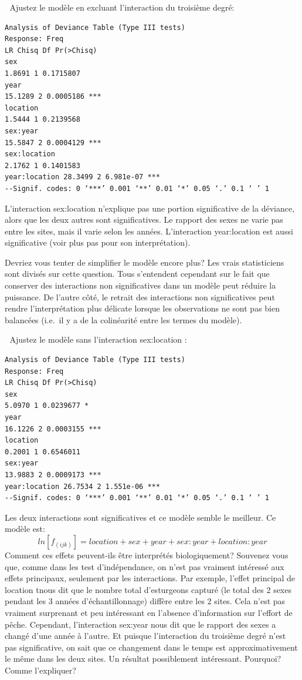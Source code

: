 \documentclass[12pt,]{book}
\begin{document}
 Ajustez le modèle en excluant l'interaction du troisième degré:

\begin{verbatim}
Analysis of Deviance Table (Type III tests)
Response: Freq
LR Chisq Df Pr(>Chisq)
sex
1.8691 1 0.1715807
year
15.1289 2 0.0005186 ***
location
1.5444 1 0.2139568
sex:year
15.5847 2 0.0004129 ***
sex:location
2.1762 1 0.1401583
year:location 28.3499 2 6.981e-07 ***
--Signif. codes: 0 ‘***’ 0.001 ‘**’ 0.01 ‘*’ 0.05 ‘.’ 0.1 ‘ ’ 1
\end{verbatim}

L'interaction sex:location n'explique pas une portion significative
de la déviance, alors que les deux autres sont significatives. Le rapport
des sexes ne varie pas entre les sites, mais il varie selon les années.
L'interaction year:location est aussi significative (voir plus pas pour
son interprétation).

Devriez vous tenter de simplifier le modèle encore plus? Les vrais
statisticiens sont divisés sur cette question. Tous s'entendent
cependant sur le fait que conserver des interactions non significatives
dans un modèle peut réduire la puissance. De l'autre côté, le retrait des
interactions non significatives peut rendre l'interprétation plus délicate
lorsque les observations ne sont pas bien balancées (i.e.~il y a de la
colinéarité entre les termes du modèle).

 Ajustez le modèle sans l'interaction sex:location :

\begin{verbatim}
Analysis of Deviance Table (Type III tests)
Response: Freq
LR Chisq Df Pr(>Chisq)
sex
5.0970 1 0.0239677 *
year
16.1226 2 0.0003155 ***
location
0.2001 1 0.6546011
sex:year
13.9883 2 0.0009173 ***
year:location 26.7534 2 1.551e-06 ***
--Signif. codes: 0 ‘***’ 0.001 ‘**’ 0.01 ‘*’ 0.05 ‘.’ 0.1 ‘ ’ 1
\end{verbatim}

Les deux interactions sont significatives et ce modèle semble le meilleur.
Ce modèle est:
\[ln[f_{(ijk)} ] = location + sex + year + sex:year + location:year\]
Comment ces effets peuvent-ils être interprétés biologiquement?
Souvenez vous que, comme dans les test d'indépendance, on n'est pas
vraiment intéressé aux effets principaux, seulement par les
interactions. Par exemple, l'effet principal de location tnous dit que le
nombre total d'esturgeons capturé (le total des 2 sexes pendant les 3
années d'échantillonnage) diffère entre les 2 sites. Cela n'est pas
vraiment surprenant et peu intéressant en l'absence d'information sur
l'effort de pêche. Cependant, l'interaction sex:year nous dit que le
rapport des sexes a changé d'une année à l'autre. Et puisque
l'interaction du troisième degré n'est pas significative, on sait que ce
changement dans le temps est approximativement le même dans les
deux sites. Un résultat possiblement intéressant. Pourquoi? Comme
l'expliquer?
\end{document}
